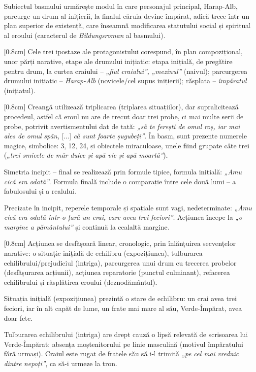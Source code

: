 Subiectul basmului urmărește modul în care personajul principal, Harap-Alb, parcurge un drum al inițierii, la finalul căruia devine împărat, adică trece într-un plan superior de existență, care înseamnă modificarea statutului social și spiritual al eroului (caracterul de \textit{Bildungsroman} al basmului).

[0.8cm]
Cele trei ipostaze ale protagonistului corespund, în plan compozițional, unor părți narative, etape ale drumului inițiatic: etapa inițială, de pregătire pentru drum, la curtea craiului -- \textit{„fiul craiului”, „mezinul”} (naivul); parcurgerea drumului inițiatic -- \textit{Harap-Alb} (novicele/cel supus inițierii); răsplata -- \textit{împăratul} (inițiatul).

[0.8cm]
Creangă utilizează triplicarea (triplarea situațiilor), dar supralicitează procedeul, astfel că eroul nu are de trecut doar trei probe, ci mai multe serii de probe, potrivit avertismentului dat de tată: \textit{„să te ferești de omul roș, iar mai ales de omul spân,} [...] \textit{că sunt foarte șugubeți”}. În basm, sunt prezente numerele magice, simbolice: 3, 12, 24, și obiectele miraculoase, unele fiind grupate câte trei (\textit{„trei smicele de măr dulce și apă vie și apă moartă”}).

Simetria incipit -- final se realizează prin formule tipice, formula inițială: \textit{„Amu cică era odată”}. Formula finală include o comparație între cele două lumi -- a fabulosului și a realului.

Precizate în incipit, reperele temporale și spațiale sunt vagi, nedeterminate: \textit{„Amu cică era odată într-o țară un crai, care avea trei feciori”}. Acțiunea începe la \textit{„o margine a pământului”} și continuă la cealaltă margine.

[0.8cm]
Acțiunea se desfășoară linear, cronologic, prin înlănțuirea secvențelor narative: o situație inițială de echilibru (expozițiunea), tulburarea echilibrului/prejudiciul (intriga), parcurgerea unui drum cu trecerea probelor (desfășurarea acțiunii), acțiunea reparatorie (punctul culminant), refacerea echilibrului și răsplătirea eroului (deznodământul).

Situația inițială (expozițiunea) prezintă o stare de echilibru: un crai avea trei feciori, iar în alt capăt de lume, un frate mai mare al său, Verde-Împărat, avea doar fete.

Tulburarea echilibrului (intriga) are drept cauză o lipsă relevată de scrisoarea lui Verde-Împărat: absența moștenitorului pe linie masculină (motivul împăratului fără urmași). Craiul este rugat de fratele său să i-l trimită \textit{„pe cel mai vrednic dintre nepoți”}, ca să-i urmeze la tron.

